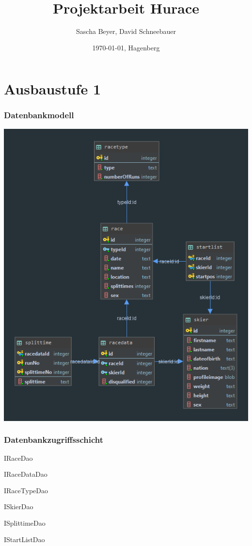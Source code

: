 \documentclass[a4paper, 12pt]{article}
\title{Projektarbeit Hurace}
\author{Sascha Beyer, David Schneebauer}
\date{\today{}, Hagenberg}
\begin{document}
	\maketitle
	\tableofcontents
	\newpage
	\section{Ausbaustufe 1}
	\subsubsection{Datenbankmodell}

	\includegraphics[width=.7\textwidth]{img/huraceDB.png}
	\newpage
	\subsubsection{Datenbankzugriffsschicht}
	\item{IRaceDao}
	
	\item{IRaceDataDao}
	
	\item{IRaceTypeDao}
	
	\item{ISkierDao}
	
	\item{ISplittimeDao}
	
	\item{IStartListDao}
	
	
	
	
	\newpage	
\end{document}
